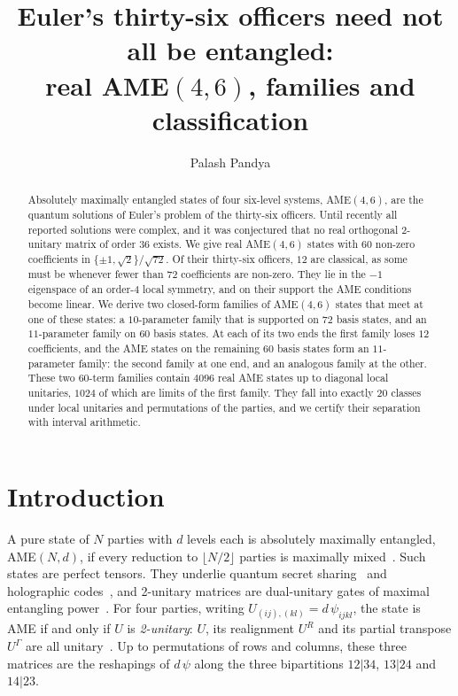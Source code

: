 \documentclass[aps,pra,reprint,superscriptaddress,amsmath,amssymb,longbibliography]{revtex4-2}
\theoremstyle{plain}
\begin{document}
\raggedbottom
\title{Euler's thirty-six officers need not all be entangled:\\ real \texorpdfstring{AME$(4,6)$}{AME(4,6)}, families and classification}
\author{Palash Pandya}

\begin{abstract}
Absolutely maximally entangled states of four six-level systems, AME$(4,6)$, are the quantum solutions of Euler's
problem of the thirty-six officers.  Until recently all reported solutions were complex, and it was conjectured that no
real orthogonal 2-unitary matrix of order $36$ exists.  We give real AME$(4,6)$ states with $60$ non-zero
coefficients in $\{\pm1,\sqrt2\}/\sqrt{72}$.  Of their thirty-six officers, $12$ are classical, as some must be whenever
fewer than $72$ coefficients are non-zero.  They lie in the $-1$
eigenspace of an order-$4$ local symmetry, and on their support the AME conditions become linear.  We derive two closed-form families of AME$(4,6)$ states that meet at one of these states: a $10$-parameter family that
is supported on $72$ basis states, and an $11$-parameter family on $60$ basis states.  At each of its two ends the first family loses $12$ coefficients, and the AME states on the remaining $60$ basis states
form an $11$-parameter family: the second family at one end, and an analogous family at the other.  These two $60$-term families contain $4096$ real AME states up to diagonal local unitaries, $1024$ of which are limits of the first family.  They fall into exactly $20$ classes under local unitaries and permutations of the parties, and we certify their separation with interval arithmetic.
\end{abstract}
\maketitle

\section{Introduction}

A pure state of $N$ parties with $d$ levels each is absolutely maximally entangled, AME$(N,d)$, if every reduction
to $\lfloor N/2\rfloor$ parties is maximally mixed~\cite{Helwig2012,GALRZ15}.  Such states are perfect tensors.  They
underlie quantum secret sharing~\cite{Helwig2012} and holographic codes~\cite{PYHP2015}, and 2-unitary matrices
are dual-unitary gates of maximal entangling power~\cite{RAL20,BKP2019}.  For four parties, writing $U_{(ij),(kl)}=d\,\psi_{ijkl}$, the state is AME if and only if
$U$ is \emph{2-unitary}: $U$, its realignment $U^R$ and its partial transpose $U^\Gamma$ are all
unitary~\cite{GALRZ15}.  Up to permutations of rows and columns, these three matrices are the reshapings of
$d\,\psi$ along the three bipartitions $12|34$, $13|24$ and $14|23$.
\end{document}
